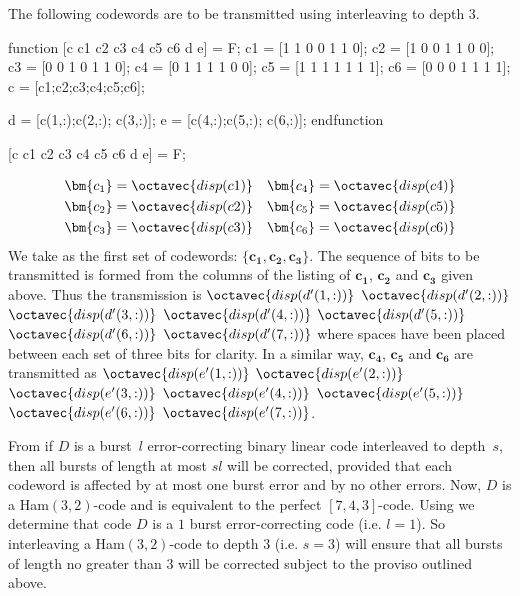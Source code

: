 The following codewords are to be transmitted using interleaving to depth $3$.
\begin{octavecode}
function [c c1 c2 c3 c4 c5 c6 d e] = F;
  c1 = [1 1 0 0 1 1 0];
  c2 = [1 0 0 1 1 0 0];
  c3 = [0 0 1 0 1 1 0];
  c4 = [0 1 1 1 1 0 0];
  c5 = [1 1 1 1 1 1 1];
  c6 = [0 0 0 1 1 1 1];
  c = [c1;c2;c3;c4;c5;c6];
        
  d = [c(1,:);c(2,:); c(3,:)];
  e = [c(4,:);c(5,:); c(6,:)];
endfunction

[c c1 c2 c3 c4 c5 c6 d e] = F;
\end{octavecode}
\begin{align*}
	\bm{c_1} &=\octavec{disp(c1)} \quad \bm{c_4} = \octavec{disp(c4)}\\
	\bm{c_2} &=\octavec{disp(c2)} \quad \bm{c_5} = \octavec{disp(c5)}\\
	\bm{c_3} &=\octavec{disp(c3)} \quad \bm{c_6} = \octavec{disp(c6)}
\end{align*}
We take as the first set of codewords: $\{\bm{c_1},\bm{c_2},\bm{c_3}\}$. The sequence of bits to be  transmitted is formed from the columns of the listing of $\bm{c_1}$, $\bm{c_2}$ and $\bm{c_3}$ given above. Thus the transmission is $\octavec{disp(d'(1,:))}$ $\octavec{disp(d'(2,:))}$ $\octavec{disp(d'(3,:))}$ $\octavec{disp(d'(4,:))}$ $\octavec{disp(d'(5,:))}$ $\octavec{disp(d'(6,:))}$ $\octavec{disp(d'(7,:))}$ where spaces have been placed between each set of three bits for clarity. In a similar way, $\bm{c_4}$, $\bm{c_5}$ and $\bm{c_6}$ are transmitted as $\octavec{disp(e'(1,:))}$ $\octavec{disp(e'(2,:))}$ $\octavec{disp(e'(3,:))}$ $\octavec{disp(e'(4,:))}$ $\octavec{disp(e'(5,:))}$ $\octavec{disp(e'(6,:))}$ $\octavec{disp(e'(7,:))}$.

From  if $D$ is a burst~$l$ error-correcting binary linear code interleaved to depth~$s$, then all bursts of length at most $sl$ will be corrected, provided that each codeword is affected by at most one burst error and by no other errors. Now, $D$ is a Ham$(3,2)$-code and is equivalent to the
perfect $[7,4,3]$-code. Using  we determine that code $D$ is a $1$ burst error-correcting code (i.e. $l=1$).
So interleaving a Ham$(3,2)$-code to depth $3$ (i.e. $s=3$) will ensure that all bursts of length no greater than $3$ will be corrected subject to the proviso outlined above.

